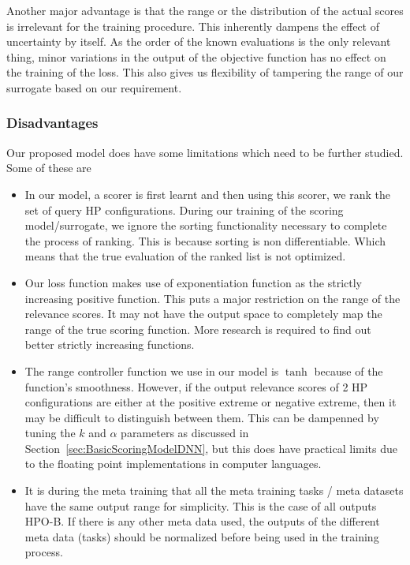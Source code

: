 \documentclass[12pt, twoside, ngerman]{report}
\begin{document}
Another major advantage is that the range or the distribution of the actual scores is irrelevant for the training procedure.
This inherently dampens the effect of uncertainty by itself.
As the order of the known evaluations is the  only relevant thing,  minor variations in the output of the objective function has no effect on the training of the loss.
This also gives us flexibility of tampering the range of our surrogate based on our requirement.

\subsubsection{Disadvantages}
Our proposed model does have some limitations which need to be further studied.
Some of these are
\begin{itemize}
\item In our model,  a scorer is first learnt and then using this scorer,  we rank the set of query HP configurations.
During our training of the scoring model/surrogate,  we ignore the sorting functionality necessary to complete the process of ranking.
This is because sorting is non differentiable. 
Which means that the true evaluation of the ranked list is not optimized.

\item Our loss function makes use of exponentiation function as the strictly increasing positive function.
This puts a major restriction on the range of the relevance scores.
It may not have the output space to completely map the range of the true scoring function.
More research is required to find out better strictly increasing functions.

\item The range controller function we use in our model is $\tanh$ because of the function's smoothness.
However,  if the output relevance scores of 2 HP configurations are either at the positive extreme or negative extreme,  then it may be difficult to distinguish between them.
This can be dampenned by tuning the $k$ and $\alpha$ parameters as discussed in Section~\ref{sec:BasicScoringModelDNN},  but this does have practical limits due to the floating point implementations in computer languages.

\item It is during the meta training that all the meta training tasks / meta datasets have the same output range for simplicity.
This is the case of all outputs HPO-B.
If there is any other meta data used,  the outputs of the different meta data (tasks) should be normalized before being used in the training process.


\end{itemize}
\end{document}
